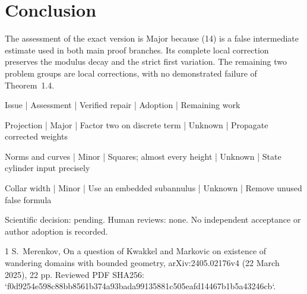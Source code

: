 \documentclass[10pt]{article}
\begin{document}
\section*{Conclusion}
The assessment of the exact version is Major because (14) is a false intermediate estimate used in both main proof branches. Its complete local correction preserves the modulus decay and the strict first variation. The remaining two problem groups are local corrections, with no demonstrated failure of Theorem 1.4.\par
Issue | Assessment | Verified repair | Adoption | Remaining work\par
Projection | Major | Factor two on discrete term | Unknown | Propagate corrected weights\par
Norms and curves | Minor | Squares; almost every height | Unknown | State cylinder input precisely\par
Collar width | Minor | Use an embedded subannulus | Unknown | Remove unused false formula\par
Scientific decision: pending. Human reviews: none. No independent acceptance or author adoption is recorded.\par
1 S. Merenkov, On a question of Kwakkel and Markovic on existence of wandering domains with bounded geometry, arXiv:2405.02176v4 (22 March 2025), 22 pp. Reviewed PDF SHA256: `f0d9254e598c88bb8561b374a93bada99135881c505eafd14467b1b5a43246cb`.\par
\end{document}
